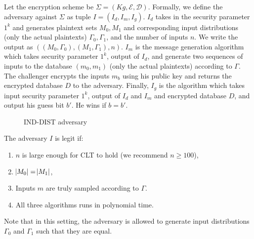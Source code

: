 Let the encryption scheme be $\Sigma = (Kg, \mathcal{E}, \mathcal{D})$. Formally, we define the adversary against $\Sigma$ as tuple $I = (I_d, I_m, I_g)$. $I_d$ takes in the security parameter $1^k$ and generates plaintext sets $M_0, M_1$ and corresponding input distributions (only the actual plaintexts) $\Gamma_0, \Gamma_1$, and the number of inputs $n$. We write the output as $((M_0, \Gamma_0), (M_1, \Gamma_1), n)$. $I_m$ is the message generation algorithm which takes security parameter $1^k$, output of $I_d$, and generate two sequences of inputs to the database $(m_0, m_1)$ (only the actual plaintexts) according to $\Gamma$. The challenger encrypts the inputs $m_b$ using his public key and returns the encrypted database $D$ to the adversary. Finally, $I_g$ is the algorithm which takes input security parameter $1^k$, output of $I_d$ and $I_m$ and encrypted database $D$, and output his guess bit $b'$. He wins if $b = b'$.


\begin{figure}[H]
	\begin{center}
	\end{center}
	\caption{IND-DIST adversary}
\end{figure}


The adversary $I$ is legit if:
\begin{enumerate}
\item $n$ is large enough for CLT to hold (we recommend $n \geq 100$),
\item $\abs{M_0} = \abs{M_1}$,
\item Inputs $m$ are truly sampled according to $\Gamma$.
\item All three algorithms runs in polynomial time.
\end{enumerate}
Note that in this setting, the adversary is allowed to generate input distributions $\Gamma_0$ and $\Gamma_1$ such that they are equal.

